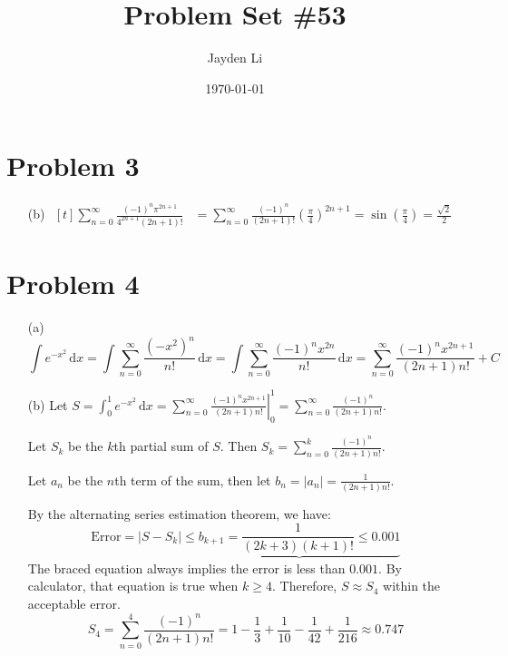 \documentclass[preview, margin=0.6in]{standalone}
\title{\vspace*{-40pt}Problem Set \#53}
\author{Jayden Li}
\date{\today}
\newcommand*{\problem}[1]{\section*{Problem #1}}
\begin{document}
\fontsize{12pt}{12pt}\selectfont
\setlength{\abovedisplayskip}{\abovedisplayskip/2}
\setlength{\belowdisplayskip}{\belowdisplayskip/2}
\setlength{\parindent}{0pt}
\setlength{\parskip}{2ex plus 0.5ex minus 0.2ex}
\maketitle

\problem{3}
\begin{itemize}
	\item[(b)]
		$\begin{aligned}[t]
			\sum_{n=0}^{\infty}\frac{(-1)^n \pi ^{2n+1}}{4^{2n+1}(2n+1)!}
			&=\sum_{n=0}^{\infty}\frac{(-1)^n}{(2n+1)!}\left(\frac{\pi}{4}\right)^{2n+1}
			=\sin\left(\frac{\pi}{4}\right)
			=\boxed{\frac{\sqrt{2}}{2}}
		\end{aligned}$
\end{itemize}

\problem{4}
\begin{itemize}
	\item[(a)]
		\begin{equation*}
			\int e^{-x^2}\,\mathrm{d}x
			=\int \sum_{n=0}^{\infty}\frac{\left(-x^2\right)^n}{n!}\,\mathrm{d}x
			=\int \sum_{n=0}^{\infty}\frac{(-1)^n x^{2n}}{n!}\,\mathrm{d}x
			=\boxed{\sum_{n=0}^{\infty}\frac{(-1)^n x^{2n+1}}{(2n+1)n!}+C}
		\end{equation*}

	\item[(b)]
		Let $\displaystyle 
			S
			=\int_{0}^{1}e^{-x^2}\,\mathrm{d}x
			=\left.\sum_{n=0}^{\infty}\frac{(-1)^n x^{2n+1}}{(2n+1)n!}\right|_{0}^{1}
			=\sum_{n=0}^{\infty}\frac{(-1)^n}{(2n+1)n!}
		$.

		Let $S_k$ be the $k$th partial sum of $S$. Then $\displaystyle 
			S_k
			=\sum_{n=0}^{k}\frac{(-1)^n}{(2n+1)n!}
		$.

		Let $a_n$ be the $n$th term of the sum, then let $b_n=\left|a_n\right|=\displaystyle \frac{1}{(2n+1)n!}$.

		By the alternating series estimation theorem, we have:
		\begin{equation*}
			\mathrm{Error}=\left|S-S_k\right|
			\leq \underbrace{b_{k+1}
			=\frac{1}{(2k+3)(k+1)!}\leq 0.001}
		\end{equation*}
		The braced equation always implies the error is less than $0.001$. By calculator, that equation is true when $k\geq4$. Therefore, $S\approx S_4$ within the acceptable error.
		\begin{equation*}
			S_4
			=\sum_{n=0}^{4}\frac{(-1)^n}{(2n+1)n!}
			=1-\frac13+\frac{1}{10}-\frac{1}{42}+\frac{1}{216}
			\approx \boxed{0.747}
		\end{equation*}
\end{itemize}
\end{document}
